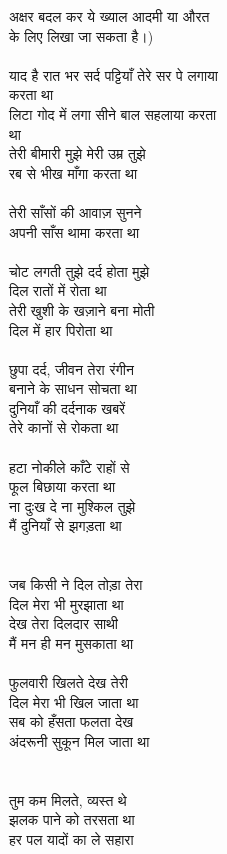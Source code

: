 {{{{{{{{{{{{{{{{{{{{{{{{{{{{{{{{{{{{{{{{{{{{{अक्षर बदल कर ये ख्याल आदमी या औरत\\
के लिए लिखा जा सकता है।)\\
\\
याद है रात भर सर्द पट्टियाँ तेरे सर पे लगाया\\
करता था\\
लिटा गोद में लगा सीने बाल सहलाया करता\\
था\\
तेरी बीमारी मुझे मेरी उम्र तुझे\\
रब से भीख माँगा करता था\\
\\
तेरी साँसों की आवाज़ सुनने\\
अपनी साँस थामा करता था\\
\\
चोट लगती तुझे दर्द होता मुझे\\
दिल रातों में रोता था\\
तेरी खुशी के खज़ाने बना मोती\\
दिल में हार पिरोता था\\
\\
छुपा दर्द, जीवन तेरा रंगीन\\
बनाने के साधन सोचता था\\
दुनियाँ की दर्दनाक खबरें\\
तेरे कानों से रोकता था\\
\\
हटा नोकीले काँटे राहों से\\
फूल बिछाया करता था\\
ना दुःख दे ना मुश्किल तुझे\\
मैं दुनियाँ से झगड़ता था\\
\\
\\
जब किसी ने दिल तोड़ा तेरा\\
दिल मेरा भी मुरझाता था\\
देख तेरा दिलदार साथी\\
मैं मन ही मन मुसकाता था\\
\\
फुलवारी खिलते देख तेरी\\
दिल मेरा भी खिल जाता था\\
सब को हँसता फलता देख\\
अंदरूनी सुकून मिल जाता था\\
\\
\\
तुम कम मिलते, व्यस्त थे\\
झलक पाने को तरसता था\\
हर पल यादों का ले सहारा\\
}}}}}}}}}}}}}}}}}}}}}}}}}}}}}}}}}}}}}}}}}}}}}
